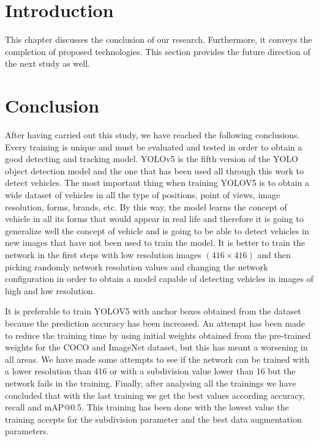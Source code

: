 \section{Introduction}
This chapter discusses the conclusion of our research. Furthermore, it conveys the completion of proposed technologies. This section provides the future direction of the next study as well.

\section{Conclusion}

After having carried out this study, we have reached the following conclusions. Every training is 
unique  and  must  be  evaluated  and  tested  in  order  to  obtain  a  good  detecting  and  tracking 
model. YOLOv5 is the fifth version of the  YOLO object  detection model and the  one  that has 
been  used  all  through  this  work  to  detect  vehicles.  The  most  important  thing  when  training 
YOLOV5 is to obtain a wide dataset of vehicles in all the type of positions, point of views, image 
resolution, forms, brands, etc. By this way, the model learns the concept of vehicle in all its forms 
that would appear in real life and therefore it is going to generalize well the concept of vehicle 
and is going to be able to detect vehicles  in new  images  that  have not  been used to train the 
model. It is better to train the network in the first steps with low resolution images $(416 \times 416)$ 
and then picking randomly network resolution values and changing the network configuration 
in order to obtain a model capable of detecting vehicles in images of high and low resolution. 



It  is  preferable  to  train  YOLOV5  with  anchor  boxes  obtained  from  the  dataset  because  the 
prediction accuracy has been increased. An attempt has been made to reduce the training time 
by  using  initial  weights  obtained  from  the  pre-trained  weights  for  the  COCO  and  ImageNet 
dataset, but this has meant a worsening in all areas. We have made some attempts to see if the 
network can be trained with a lower resolution than 416 or with a subdivision value lower than 
16  but  the  network  fails  in  the  training.  Finally,  after  analysing  all  the  trainings  we  have 
concluded  that  with  the  last  training  we  get  the  best  values  according  accuracy,  recall  and 
mAP@0.5.  This  training  has  been  done  with  the  lowest  value  the  training  accepts  for  the 
subdivision parameter and the best data augmentation parameters. 



